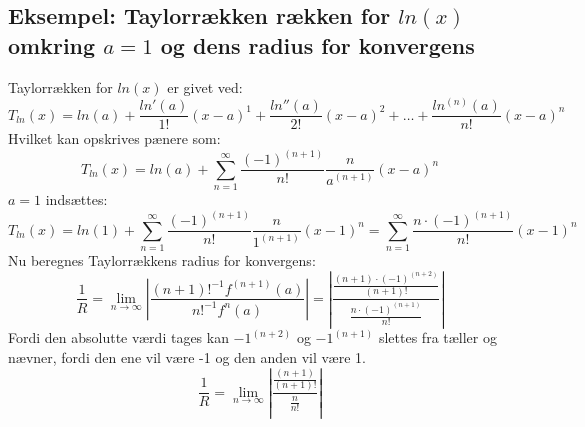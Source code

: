 \subsection*{\textbf{Eksempel:} Taylorrækken rækken for $ln(x)$ omkring $a = 1$ og dens radius for konvergens} %
Taylorrækken for $ln(x)$ er givet ved:
\[
    T_{ln}(x) = ln(a) + \frac{ln'(a)}{1!}(x-a)^1 + \frac{ln''(a)}{2!}(x-a)^2 + \ldots + \frac{ln^{(n)}(a)}{n!}(x - a)^n
\]
Hvilket kan opskrives pænere som:
\[
    T_{ln}(x) = ln(a) + \sum^{\infty}_{n = 1} \frac{(-1)^{(n + 1)}}{n!} \frac{n}{a^{(n+1)}}(x-a)^n
\]
$a = 1$ indsættes:
\[
    T_{ln}(x) = ln(1) + \sum^{\infty}_{n = 1} \frac{(-1)^{(n + 1)}}{n!} \frac{n}{1^{(n+1)}}(x-1)^n = \sum^{\infty}_{n = 1} \frac{n \cdot (-1)^{(n + 1)}}{n!} (x-1)^n
\]
Nu beregnes Taylorrækkens radius for konvergens: %
\[
    \frac{1}{R} = \lim_{n \rightarrow \infty} \left\lvert \frac{(n + 1)!^{-1}f^{(n+1)}(a)}{n!^{-1}f^n(a)} \right\lvert
    = \left\lvert \frac{\frac{(n+1) \cdot (-1)^{(n + 2)}}{(n+1)!}}{\frac{n \cdot (-1)^{(n + 1)}}{n!}} \right\lvert
\]
Fordi den absolutte værdi tages kan $-1^{(n+2)}$ og $-1^{(n + 1)}$ slettes fra tæller og nævner,
fordi den ene vil være -1 og den anden vil være 1.
\[
    \frac{1}{R} = \lim_{n \rightarrow \infty} \left\lvert \frac{\frac{(n+1)}{(n+1)!}}{\frac{n}{n!}} \right\lvert
\]

